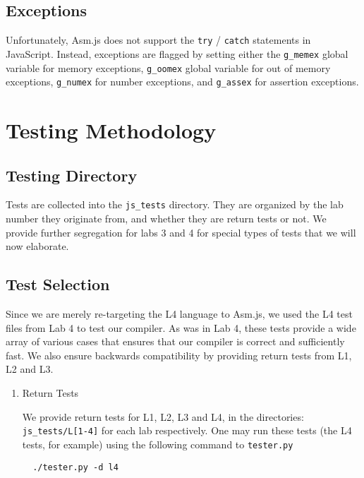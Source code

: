 \documentclass[twoside]{article}
\begin{document}
\begin{multicols}{2}
  \subsection{Exceptions}
    Unfortunately, Asm.js does not support the \texttt{try} / \texttt{catch}
    statements in JavaScript.
    Instead, exceptions are flagged by setting either the \texttt{g\_memex} global variable
    for memory exceptions, \texttt{g\_oomex} global variable for out of memory
    exceptions, \texttt{g\_numex} for number exceptions, and \texttt{g\_assex} for
    assertion exceptions.


\section{Testing Methodology}

\subsection{Testing Directory}
Tests are collected into the \texttt{js\_tests} directory. They are organized
by the lab number they originate from, and whether they are return tests or not. 
We provide further segregation for labs 3 and 4 for special types of tests that
we will now elaborate. 

\subsection{Test Selection}
Since we are merely re-targeting the L4 language to Asm.js, we used the L4 test
files from Lab 4 to test our compiler. As was in Lab 4, these tests provide a
wide array of various cases that ensures that our compiler is correct and
sufficiently fast. We also ensure backwards compatibility by providing return
tests from L1, L2 and L3. 

\begin{enumerate}

  \item Return Tests

  We provide return tests for L1, L2, L3 and L4, in the directories: 
  \texttt{js\_tests/L[1-4]} for each lab respectively. One may run these 
  tests (the L4 tests, for example) using the following command to \texttt{tester.py}
\begin{verbatim}
  ./tester.py -d l4
\end{verbatim}


\end{enumerate}
\end{multicols}
\end{document}
